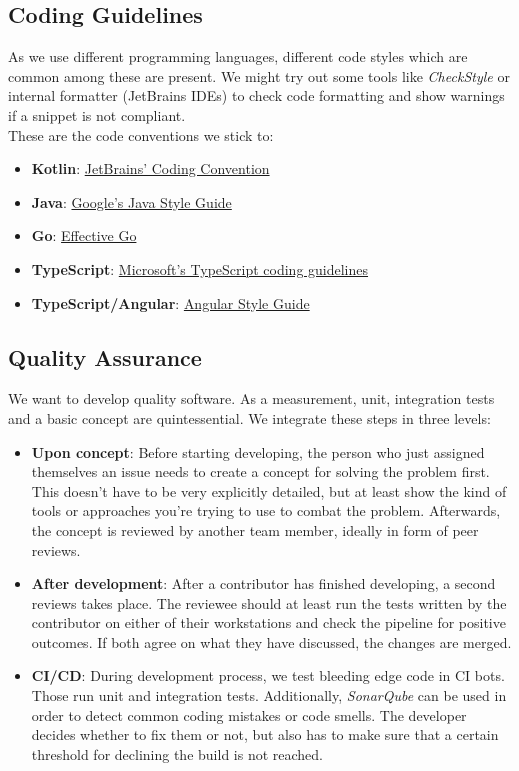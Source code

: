 \documentclass[a4paper,12pt,chapterprefix=false,bibliography=totoc,listof=totoc,]{scrreprt}
\begin{document}
\subsection{Coding Guidelines}
As we use different programming languages, different code styles which are common among these are present. We might try out some tools like \emph{CheckStyle} or internal formatter (JetBrains IDEs) to check code formatting and show warnings if a snippet is not compliant. \\

These are the code conventions we stick to:
\begin{itemize}
	\item \textbf{Kotlin}: \href{https://kotlinlang.org/docs/reference/coding-conventions.html}{JetBrains' Coding Convention}
	\item \textbf{Java}: \href{https://google.github.io/styleguide/javaguide.html}{Google's Java Style Guide}
	\item \textbf{Go}: \href{https://golang.org/doc/effective_go.html}{Effective Go}
	\item \textbf{TypeScript}: \href{https://github.com/microsoft/TypeScript/wiki/Coding-guidelines}{Microsoft's TypeScript coding guidelines}
	\item \textbf{TypeScript/Angular}: \href{https://angular.io/guide/styleguide}{Angular Style Guide}
\end{itemize}

\subsection{Quality Assurance}
\label{sec:support_qa}
We want to develop quality software. As a measurement, unit, integration tests and a basic concept are quintessential. We integrate these steps in three levels:
\begin{itemize}
	\item \textbf{Upon concept}: Before starting developing, the person who just assigned themselves an issue needs to create a concept for solving the problem first. This doesn't have to be very explicitly detailed, but at least show the kind of tools or approaches you're trying to use to combat the problem. Afterwards, the concept is reviewed by another team member, ideally in form of peer reviews.
	\item \textbf{After development}: After a contributor has finished developing, a second reviews takes place. The reviewee should at least run the tests written by the contributor on either of their workstations and check the pipeline for positive outcomes. If both agree on what they have discussed, the changes are merged.
	\item \textbf{CI/CD}: During development process, we test bleeding edge code in CI bots. Those run unit and integration tests. Additionally, \emph{SonarQube} can be used in order to detect common coding mistakes or code smells. The developer decides whether to fix them or not, but also has to make sure that a certain threshold for declining the build is not reached.
\end{itemize}
\end{document}
